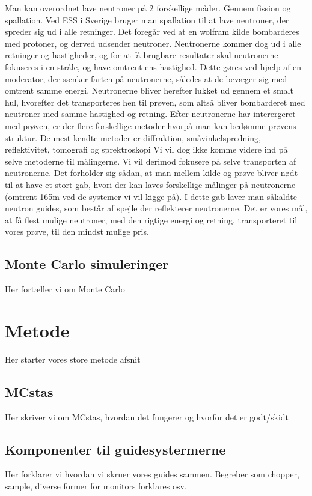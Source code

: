 \documentclass[12pt,oneside,a4paper]{article}
\begin{document}
{{{{{Man kan overordnet lave neutroner på 2 forskellige måder. Gennem fission og spallation. Ved ESS i Sverige bruger man spallation til at lave neutroner, der spreder sig ud i alle retninger. Det foregår ved at en wolfram kilde bombarderes med protoner, og derved udsender neutroner. Neutronerne kommer dog ud i alle retninger og hastigheder, og for at få brugbare resultater skal neutronerne fokuseres i en stråle, og have omtrent ens hastighed. Dette gøres ved hjælp af en moderator, der sænker farten på neutronerne, således at de bevæger sig med omtrent samme energi. Neutronerne bliver herefter lukket ud gennem et smalt hul, hvorefter det transporteres hen til prøven, som altså bliver bombarderet med neutroner med samme hastighed og retning. Efter neutronerne har interergeret med prøven, er der flere forskellige metoder hvorpå man kan bedømme prøvens struktur. De mest kendte metoder er diffraktion, småvinkelspredning, reflektivitet, tomografi og sprektroskopi \cite{ess_folder}
Vi vil dog ikke komme videre ind på selve metoderne til målingerne. Vi vil derimod fokusere på selve transporten af neutronerne. Det forholder sig sådan, at man mellem kilde og prøve bliver nødt til at have et stort gab, hvori der kan laves forskellige målinger på neutronerne (omtrent 165m ved de systemer vi vil kigge på). I dette gab laver man såkaldte neutron guides, som består af spejle der reflekterer neutronerne. Det er vores mål, at få flest mulige neutroner, med den rigtige energi og retning, transporteret til vores prøve, til den mindst mulige pris.


\subsection{Monte Carlo simuleringer}
Her fortæller vi om Monte Carlo 




\section{Metode}
Her starter vores store metode afsnit

\subsection{MCstas}
Her skriver vi om MCstas, hvordan det fungerer og hvorfor det er godt/skidt

\subsection{Komponenter til guidesystermerne}
Her forklarer vi hvordan vi skruer vores guides sammen. Begreber som chopper, sample, diverse former for monitors forklares osv.

}}}}}
\end{document}
